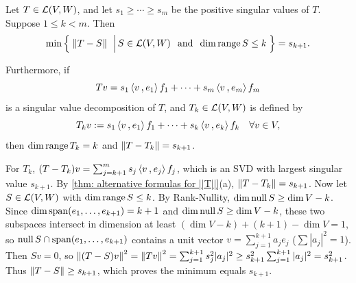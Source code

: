 \begin{thm}
  \label{thm: best approximation by rank k}
  Let $T \in \mathcal{L} (V,W)$, and let $s_1 \geq \cdots \geq s_m$ be the positive singular values of $T$. Suppose $1 \leq k < m$. Then
  \begin{equation}
    \min \left\{ \; \left \lVert T-S \right \rVert \; \,\Big\vert\, S \in \mathcal{L} (V,W) \;\;\, \text{and}\;\; \dim \operatorname{range} S \leq k \; \right\} = s_{k+1}.
  \end{equation}

  Furthermore, if
  \begin{equation}
    Tv = s_1 \ip{v}{e_1}f_1 + \cdots + s_m \ip{v}{e_m}f_m
  \end{equation}
  is a singular value decomposition of $T$, and $T_k \in \mathcal{L}(V,W)$ is defined by
  \begin{equation}
    T_k v := s_1 \ip{v}{e_1}f_1 + \cdots + s_k \ip{v}{e_k}f_k \quad \forall v \in V,
  \end{equation}
  then $\dim \operatorname{range} T_k = k$ and $\left \lVert T-T_k \right \rVert = s_{k+1}$.
\end{thm}
\begin{prf}
  For $T_k$, $(T-T_k)v = \sum_{j=k+1}^m s_j \ip{v}{e_j} f_j$, which is an SVD with largest singular value $s_{k+1}$. By \ref{thm: alternative formulas for ||T||}(a), $\left \lVert T-T_k \right \rVert = s_{k+1}$.
  Now let $S \in \mathcal{L}(V,W)$ with $\dim \operatorname{range} S \leq k$. By Rank-Nullity, $\dim \operatorname{null} S \geq \dim V - k$.
  Since $\dim \operatorname{span} (e_1, \dots, e_{k+1}) = k+1$ and $\dim \operatorname{null} S \geq \dim V - k$, these two subspaces intersect in dimension at least $(\dim V - k) + (k+1) - \dim V = 1$, so $\operatorname{null} S \cap \operatorname{span} (e_1, \dots, e_{k+1})$ contains a unit vector $v = \sum_{j=1}^{k+1} a_j e_j$ ($\sum |a_j|^2 = 1$).
  Then $Sv = 0$, so $\left \lVert (T-S)v \right \rVert^2 = \left \lVert Tv \right \rVert^2 = \sum_{j=1}^{k+1} s_j^2 |a_j|^2 \geq s_{k+1}^2 \sum_{j=1}^{k+1} |a_j|^2 = s_{k+1}^2$.
  Thus $\left \lVert T-S \right \rVert \geq s_{k+1}$, which proves the minimum equals $s_{k+1}$.
\end{prf}

